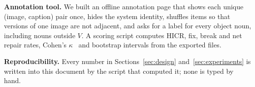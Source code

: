 \textbf{Annotation tool.} We built an offline annotation page that shows each unique (image, caption) pair once, hides the system identity, shuffles items so that versions of one image are not adjacent, and asks for a label for every object noun, including nouns outside $V$. A scoring script computes HICR, fix, break and net repair rates, Cohen's $\kappa$~\cite{cohen1960coefficient} and bootstrap intervals from the exported files.

\textbf{Reproducibility.} Every number in Sections~\ref{sec:design} and~\ref{sec:experiments} is written into this document by the script that computed it; none is typed by hand.


